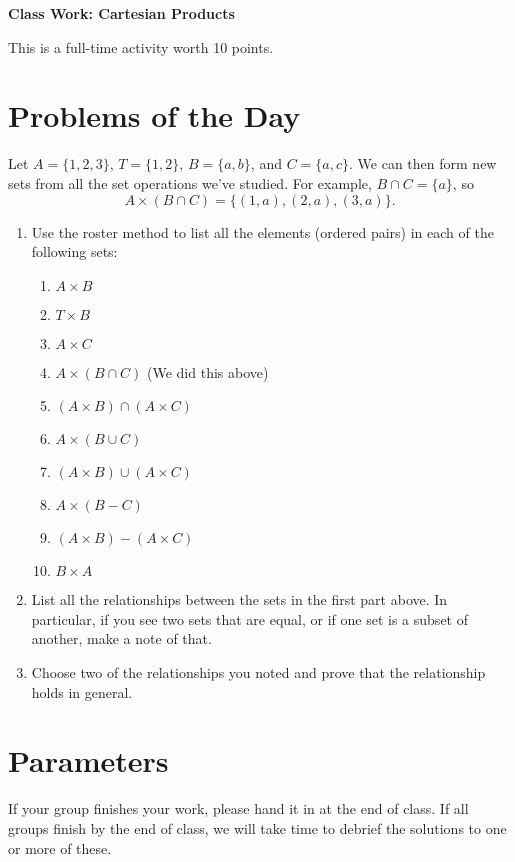 \documentclass[11pt]{article}
\begin{document}
	
	\thispagestyle{empty}
	\renewcommand{\headrulewidth}{0.0pt}
	\thispagestyle{fancy}
	\lfoot{}
	\cfoot{}
	\rfoot{}	
	
	\vspace*{0in}

		\begin{center}
			\begin{large}
			\textbf{Class Work: Cartesian Products} \\
			\end{large}
			This is a full-time activity worth 10 points. 
			
		\end{center}
		

\section*{Problems of the Day}

Let $A = \{ 1, 2, 3\}$, $T = \{ 1, 2\}$, $B = \{ a, b\}$, and $C = \{ a, c\}$. We can then form new sets from all the set operations we've studied. For example, $B \cap C = \{ a \}$, so
\[ A \times (B \cap C) = \{ (1, a), (2, a), (3, a) \}. \]

\begin{enumerate}
	\item Use the roster method to list all the elements (ordered pairs) in each of the following sets: 
	\begin{enumerate}
		\item $A \times B$ 
		\item $T \times B$
		\item $A \times C$
		\item $A \times (B \cap C)$ (We did this above)
		\item $(A \times B) \cap (A \times C)$
		\item $A \times (B \cup C)$
		\item $(A \times B) \cup (A \times C)$
		\item $A \times (B - C)$
		\item $(A \times B) - (A \times C)$
		\item $B \times A$
	\end{enumerate}
	
	\item List all the relationships between the sets in the first part above. In particular, if you see two sets that are equal, or if one set is a subset of another, make a note of that. 
	
	\item Choose two of the relationships you noted and prove that the relationship holds in general. 
	
\end{enumerate}

\section*{Parameters}

If your group finishes your work, please hand it in at the end of class. If all groups finish by the end of class, we will take time to debrief the solutions to one or more of these. 
\end{document}
